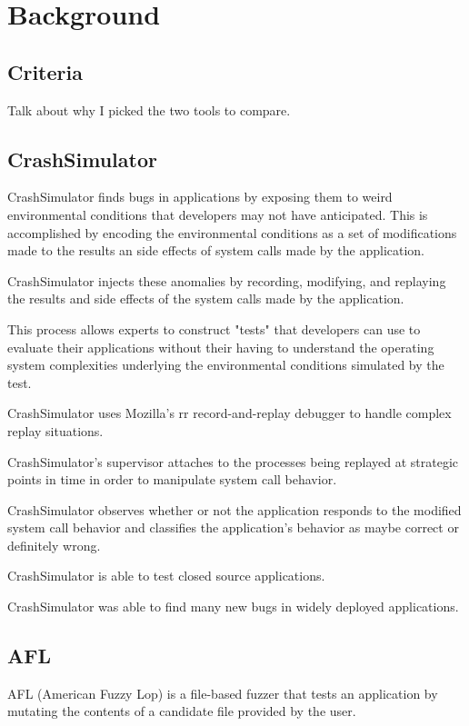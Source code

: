\section{Background}
\label{SEC:background}

\subsection{Criteria}
Talk about why I picked the two tools to compare.

\subsection{CrashSimulator}

CrashSimulator finds bugs in applications by exposing them to weird
environmental conditions that developers may not have anticipated.  This is
accomplished by encoding the environmental conditions as a set of
modifications made to the results an side effects of system calls made by
the application.

CrashSimulator injects these anomalies by recording, modifying, and
replaying the results and side effects of the system calls made by the
application.

This process allows experts to construct "tests" that developers can use to
evaluate their applications without their having to understand the
operating system complexities underlying the environmental conditions
simulated by the test.

CrashSimulator uses Mozilla's rr record-and-replay debugger to handle
complex replay situations.

CrashSimulator's supervisor attaches to the processes being replayed at
strategic points in time in order to manipulate system call behavior.

CrashSimulator observes whether or not the application responds to the
modified system call behavior and classifies the application's behavior as
maybe correct or definitely wrong.

CrashSimulator is able to test closed source applications.

CrashSimulator was able to find many new bugs in widely deployed
applications.


\subsection{AFL}

AFL (American Fuzzy Lop) is a file-based fuzzer that tests an application
by mutating the contents of a candidate file provided by the user.

